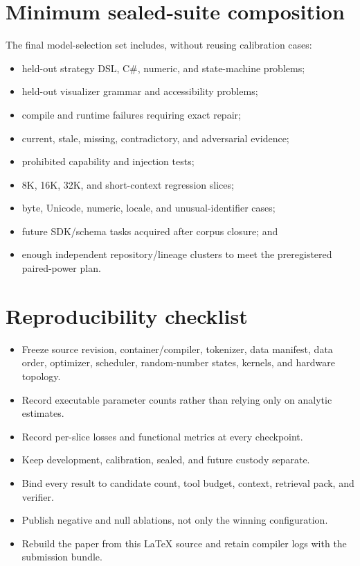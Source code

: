 \documentclass[10pt,letterpaper]{article}
\newcommand{\1}{\mathbb{1}}
\begin{document}
\section{Minimum sealed-suite composition}

The final model-selection set includes, without reusing calibration cases:
\begin{itemize}
  \item held-out strategy DSL, C\#, numeric, and state-machine problems;
  \item held-out visualizer grammar and accessibility problems;
  \item compile and runtime failures requiring exact repair;
  \item current, stale, missing, contradictory, and adversarial evidence;
  \item prohibited capability and injection tests;
  \item 8K, 16K, 32K, and short-context regression slices;
  \item byte, Unicode, numeric, locale, and unusual-identifier cases;
  \item future SDK/schema tasks acquired after corpus closure; and
  \item enough independent repository/lineage clusters to meet the preregistered paired-power plan.
\end{itemize}

\section{Reproducibility checklist}

\begin{itemize}
  \item Freeze source revision, container/compiler, tokenizer, data manifest, data order, optimizer,
        scheduler, random-number states, kernels, and hardware topology.
  \item Record executable parameter counts rather than relying only on analytic estimates.
  \item Record per-slice losses and functional metrics at every checkpoint.
  \item Keep development, calibration, sealed, and future custody separate.
  \item Bind every result to candidate count, tool budget, context, retrieval pack, and verifier.
  \item Publish negative and null ablations, not only the winning configuration.
  \item Rebuild the paper from this LaTeX source and retain compiler logs with the submission bundle.
\end{itemize}
\end{document}
